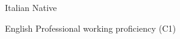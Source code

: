 
\begin{cvskills}

  \cvskill
    {Italian} %
    {Native} %

  \cvskill
    {English} %
    {Professional working proficiency (C1)} %

\end{cvskills}

